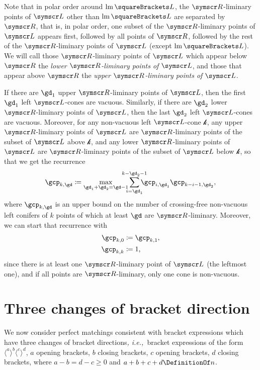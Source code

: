 \documentclass[10pt, a4paper, twoside]{basestyle}
\newcommand{\idest}{\emph{, i.e.,\ }}
\DeclareMathOperator{\leftmost}{lm}
\newcommand{\pointset}{\symscr}
\begin{document}
Note that in polar order around $\leftmost\of L$, the $\pointset R$-liminary points of $\pointset L$ other than
$\leftmost\of L$ are separated by
$\pointset R$, that is, in polar order, one subset of the $\pointset R$-liminary points of $\pointset L$ appears
first, followed by
all points of $\pointset R$, followed by the rest of the $\pointset R$-liminary points of $\pointset L$ (except
$\leftmost\of L$).
We will call those $\pointset R$-liminary points of $\pointset L$ which appear below $\pointset R$ the \emph{lower
$\pointset R$-liminary points of $\pointset L$},
and those that appear above $\pointset R$ the \emph{upper $\pointset R$-liminary points of $\pointset L$}.

If there are $\gd_1$ upper $\pointset R$-liminary points of $\pointset L$, then the first $\gd_1$ left
$\pointset L$-cones are vacuous.
Similarly, if there are $\gd_2$ lower $\pointset R$-liminary points of $\pointset L$, then the last
$\gd_2$ left $\pointset L$-cones are vacuous. Moreover, for any non-vacuous left $\pointset L$-cone
$\mathscr{k}$, any upper $\pointset R$-liminary points
of $\pointset L$ are $\pointset R$-liminary points of the
subset of $\pointset L$ above $\mathscr{k}$, and any lower $\pointset R$-liminary points of $\pointset L$ are
$\pointset R$-liminary points of the
subset of $\pointset L$ below $\mathscr{k}$, so that we get the recurrence
\[\gcp_{k,\gd}\DefineAs\max_{\gd_1+\gd_2=\gd-1}\sum{i=\gd_1}[k-\gd_2-1]\gcp_{i,\gd_1}\gcp_{k-i-1,\gd_2}\text,\]
where $\gcp_{k,\gd}$ is an upper bound on the number of crossing-free non-vacuous left conifers of $k$ points
of which at least $\gd$ are $\pointset R$-liminary.
Moreover, we can start that recurrence with
\begin{align*}
\gcp_{k,0}&\DefineAs\gcp_{k,1}\text,\\
\gcp_{k,k}&\DefineAs1\text,
\end{align*}
since there is at least one $\pointset R$-liminary point of $\pointset L$ (the leftmost one), and if all points are
$\pointset R$-liminary,
only one cone is non-vacuous.
\section{Three changes of bracket direction}
\label{sectionThreeChanges}
We now consider perfect matchings consistent with bracket expressions which have three
changes of bracket directions\idest bracket expressions of the form
$\langle^a\rangle^b\langle^c\rangle^d$,
$a$ opening brackets, $b$ closing brackets, $c$ opening brackets, $d$ closing brackets, where
$a-b=d-c\geq 0$ and $a+b+c+d\DefinitionOf n$.
\end{document}
